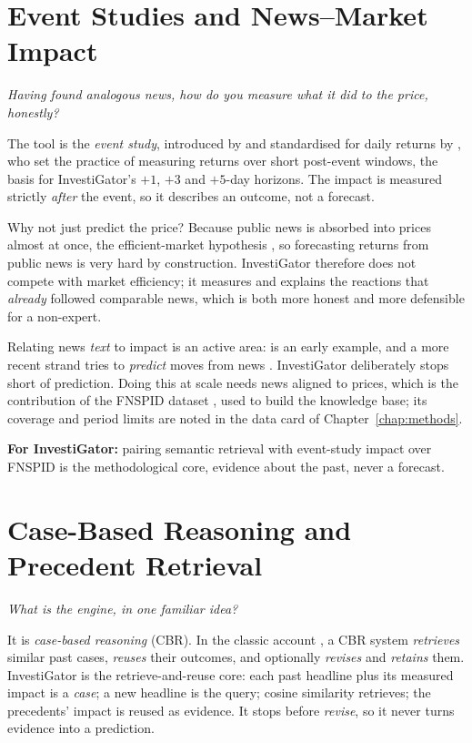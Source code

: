 \section{Event Studies and News--Market Impact}
\label{sec:sota_eventstudy}

\emph{Having found analogous news, how do you measure what it did to the price, honestly?}

The tool is the \emph{event study}, introduced by \textcite{fama1969adjustment} and standardised for daily
returns by \textcite{brown1985daily}, who set the practice of measuring returns over short post-event
windows, the basis for InvestiGator's $+1$, $+3$ and $+5$-day horizons. The impact is measured strictly
\emph{after} the event, so it describes an outcome, not a forecast.

Why not just predict the price? Because public news is absorbed into prices almost at once, the
efficient-market hypothesis \autocite{fama1970efficient}, so forecasting returns from public news is very
hard by construction. InvestiGator therefore does not compete with market efficiency; it measures and explains
the reactions that \emph{already} followed comparable news, which is both more honest and more defensible
for a non-expert.

Relating news \emph{text} to impact is an active area: \textcite{tetlock2007media} is an early example, and
a more recent strand tries to \emph{predict} moves from news \autocite{xing2018nlffsurvey, ding2015deep}.
InvestiGator deliberately stops short of prediction. Doing this at scale needs news aligned to prices, which is
the contribution of the FNSPID dataset \autocite{dong2024fnspid}, used to build the knowledge base; its
coverage and period limits are noted in the data card of Chapter~\ref{chap:methods}.

\textbf{For InvestiGator:} pairing semantic retrieval with event-study impact over FNSPID is the methodological
core, evidence about the past, never a forecast.

\section{Case-Based Reasoning and Precedent Retrieval}
\label{sec:sota_cbr}

\emph{What is the engine, in one familiar idea?}

It is \emph{case-based reasoning} (CBR). In the classic account \autocite{aamodt1994cbr}, a CBR system
\emph{retrieves} similar past cases, \emph{reuses} their outcomes, and optionally \emph{revises} and
\emph{retains} them. InvestiGator is the retrieve-and-reuse core: each past headline plus its measured impact is
a \emph{case}; a new headline is the query; cosine similarity retrieves; the precedents' impact is reused as
evidence. It stops before \emph{revise}, so it never turns evidence into a prediction.

